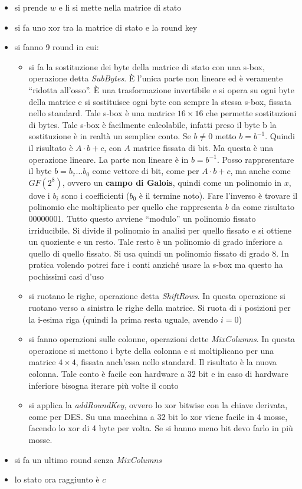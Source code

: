 \documentclass[a4paper,12pt, oneside]{book}
\begin{document}
\begin{itemize}
  \item si prende $w$ e li si mette nella matrice di stato
  \item si fa uno xor tra la matrice di stato e la round key
  \item si fanno 9 round in cui:
  \begin{itemize}
    \item si fa la sostituzione dei byte della matrice di stato con una s-box,
    operazione detta \textit{SubBytes}. È l'unica parte non lineare ed è
    veramente ``ridotta all'osso''. È una trasformazione invertibile e si opera
    su ogni byte della matrice e si sostituisce ogni byte con sempre la stessa
    s-box, fissata nello standard. Tale s-box è una matrice $16\times 16$ che
    permette sostituzioni di bytes. Tale s-box è facilmente calcolabile, infatti
    preso il byte b la sostituzione è in realtà un semplice conto. Se $b\neq 0$
    metto $b=b^{-1}$. Quindi il risultato è $A\cdot b+c$, con $A$ matrice
    fissata di bit. Ma questa è una operazione lineare. La parte non lineare è
    in $b=b^{-1}$. Posso rappresentare il byte $b=b_7\ldots b_0$ come vettore di
    bit, come per 
    $A\cdot b+c$, ma anche come $GF(2^8)$, ovvero un \textbf{campo di Galois},
    quindi come un polinomio in $x$, dove i $b_i$ sono i coefficienti ($b_0$ è
    il termine noto). Fare l'inverso è trovare il polinomio che moltiplicato per
    quello che rappresenta $b$ da come risultato 00000001. Tutto questo avviene
    ``modulo'' un polinomio fissato irriducibile. Si divide il polinomio in
    analisi per quello fissato e si ottiene un quoziente e un resto. Tale
    resto è un polinomio di grado inferiore a quello di quello fissato. Si usa
    quindi un polinomio fissato di grado 8. In pratica volendo potrei fare i
    conti anziché usare la s-box ma questo ha pochissimi casi d'uso
    \item si ruotano le righe, operazione detta \textit{ShiftRows}. In questa
    operazione si ruotano verso a sinistra le righe della matrice. Si ruota di
    $i$ posizioni per la i-esima riga (quindi la prima resta uguale, avendo
    $i=0$) 
    \item si fanno operazioni sulle colonne, operazioni dette
    \textit{MixColumns}. In questa operazione si mettono i byte della colonna e
    si moltiplicano per una matrice $4\times 4$, fissata anch'essa nello
    standard. Il risultato è la nuova 
    colonna. Tale conto è facile con hardware a 32 bit e in caso di hardware
    inferiore bisogna iterare più volte il conto 
    \item si applica la \textit{addRoundKey}, ovvero lo xor bitwise con la
    chiave derivata, come per DES. Su una macchina a 32 bit lo xor viene facile
    in 4 mosse, facendo lo xor di 4 byte per volta. Se si hanno meno bit devo
    farlo in più mosse.   
  \end{itemize}
  \item si fa un ultimo round senza \textit{MixColumns}
  \item lo stato ora raggiunto è $c$
\end{itemize}
\end{document}

